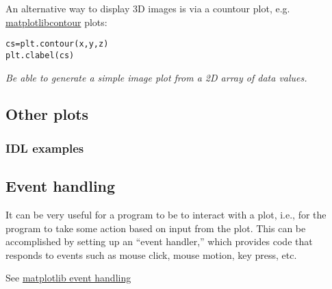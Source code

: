 \documentclass{article}
\newcommand{\test}[1]{%
    \begin{center}
        \colorbox{hl}{\parbox{0.9\textwidth}{\emph{#1}}}
    \end{center}}
\begin{document}
An alternative way to display 3D images is via a countour plot, e.g.
\href{http://matplotlib.org/examples/pylab_examples/contour_demo.html}
{matplotlibcontour} plots:
\begin{verbatim}
cs=plt.contour(x,y,z)
plt.clabel(cs)
\end{verbatim}

\test{Be able to generate a simple image plot from a 2D array of data
values.}

\subsection{Other plots}
\subsubsection{IDL examples}
\subsection{Event handling}
It can be very useful for a program to be to interact with a plot,
i.e., for the program to take some action based on input from the
plot. This can be accomplished by setting up an ``event handler,''
which provides code that responds to events such as mouse click, mouse
motion, key press, etc.

See \href{http://matplotlib.org/users/event_handling.html}
{matplotlib event handling}
\end{document}
